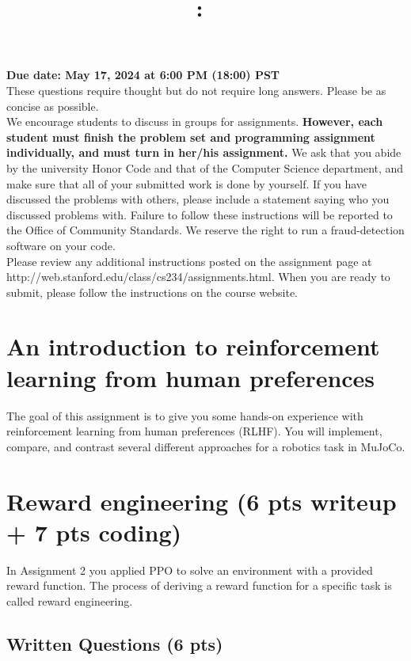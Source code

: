 \documentclass{article}
\title{
\vspace{-1in}
\textmd{\textbf{\hmwkClass:\ \hmwkTitle}}}
\author{}
\date{} %
\begin{document}
\maketitle
\vspace{-.5in}
\begin{framed}
{\bf Due date: May 17, 2024 at 6:00 PM (18:00) PST}
\\[1em]
These questions require thought but do not require long answers. Please be as concise as possible.
\\[1em]
We encourage students to discuss in groups for assignments. \textbf{However, each student must finish the
problem set and programming assignment individually, and must turn in her/his assignment.} We ask
that you abide by the university Honor Code and that of the Computer Science department, and make
sure that all of your submitted work is done by yourself. If you have discussed the problems with others,
please include a statement saying who you discussed problems with. Failure to follow these instructions
will be reported to the Office of Community Standards. We reserve the right to run a fraud-detection software on your code.
\\[1em]
Please review any additional instructions posted on the assignment page at
http://web.stanford.edu/class/cs234/assignments.html. When you are ready to submit, please
follow the instructions on the course website.
\\[1em]
\end{framed}

\section*{An introduction to reinforcement learning from human preferences}

The goal of this assignment is to give you some hands-on experience with reinforcement learning from human preferences (RLHF). You will implement, compare, and contrast several different approaches for a robotics task in MuJoCo.

\section{Reward engineering (6 pts writeup + 7 pts coding)}

In Assignment 2 you applied PPO to solve an environment with a provided reward function. The process of deriving a reward function for a specific task is called reward engineering.

\subsection{Written Questions (6 pts)}
\end{document}
